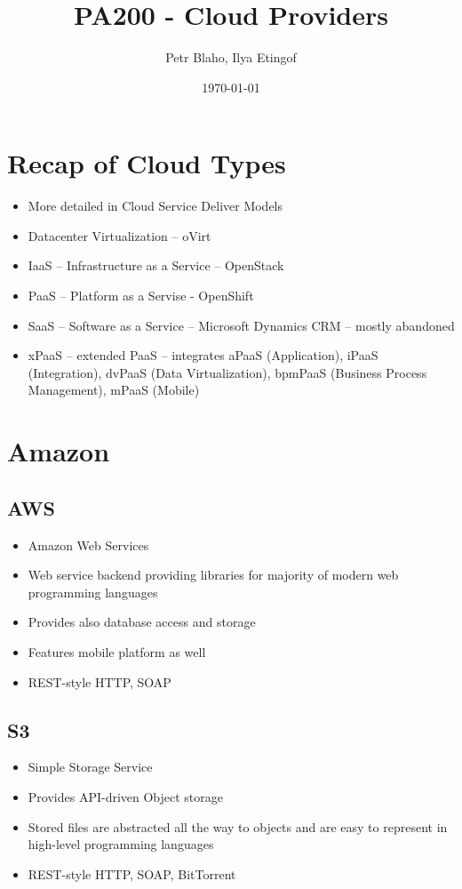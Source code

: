\documentclass[11pt]{article}
\author{Petr Blaho, Ilya Etingof}
\date{\today}
\title{PA200 - Cloud Providers}
\begin{document}
\maketitle

\section*{Recap of Cloud Types}
\label{sec:orgbf39e2a}

\begin{itemize}
\item More detailed in Cloud Service Deliver Models
\item Datacenter Virtualization -- oVirt
\item IaaS -- Infrastructure as a Service -- OpenStack
\item PaaS -- Platform as a Servise - OpenShift
\item SaaS -- Software as a Service -- Microsoft Dynamics CRM -- mostly
abandoned
\item xPaaS -- extended PaaS -- integrates aPaaS (Application), iPaaS
(Integration), dvPaaS (Data Virtualization), bpmPaaS (Business
Process Management), mPaaS (Mobile)
\end{itemize}

\section*{Amazon}
\label{sec:org168cbb3}

\subsection*{AWS}
\label{sec:org35f263a}
\begin{itemize}
\item Amazon Web Services
\item Web service backend providing libraries for majority of modern web programming languages
\item Provides also database access and storage
\item Features mobile platform as well
\item REST-style HTTP, SOAP
\end{itemize}

\subsection*{S3}
\label{sec:org6a291d5}
\begin{itemize}
\item Simple Storage Service
\item Provides API-driven Object storage
\item Stored files are abstracted all the way to objects and are easy to
represent in high-level programming languages
\item REST-style HTTP, SOAP, BitTorrent
\end{itemize}
\end{document}
